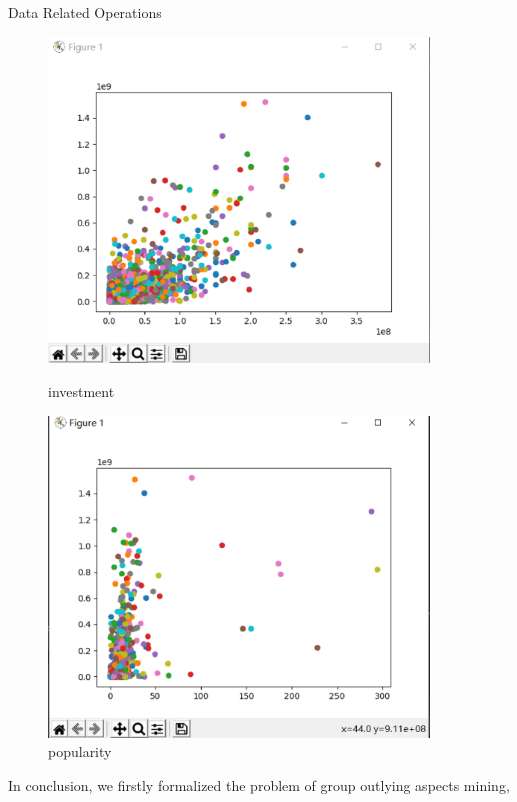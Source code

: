 \documentclass[
 size=14pt,
 paper=smartboard,  %
 mode=present, 		%
 display=slides, 	%
 style=tuliplab,  	%
 pauseslide,
 fleqn,leqno]{powerdot}
\begin{document}
\begin{slide}[toc=,bm=]{ Data Related Operations}
\begin{itemize}
  
  \end{itemize}
  \begin{figure}[htbp]
    \centering
    \begin{minipage}[t]{0.48\textwidth}
      \centering
      \includegraphics[width=0.9\textwidth]{logos/25.eps}
      \vspace{0.4em}
      \caption{investment}
    \end{minipage}
    \begin{minipage}[t]{0.48\textwidth}
      \centering
      \includegraphics[width=0.9\textwidth]{logos/26.eps}
      \vspace{0.4em}
      \caption{popularity}
    \end{minipage}
  \end{figure}
  \begin{note}
  In conclusion,
  we firstly formalized the problem of
  group outlying aspects mining,
  

\end{note}
\end{slide}
\end{document}
